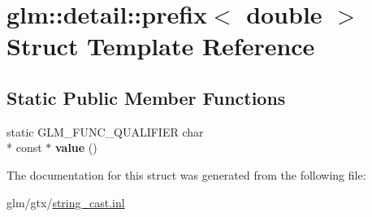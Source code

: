 \hypertarget{structglm_1_1detail_1_1prefix_3_01double_01_4}{\section{glm\-:\-:detail\-:\-:prefix$<$ double $>$ Struct Template Reference}
\label{structglm_1_1detail_1_1prefix_3_01double_01_4}
}
\subsection*{Static Public Member Functions}
\begin{DoxyCompactItemize}
\item 
\hypertarget{structglm_1_1detail_1_1prefix_3_01double_01_4_a39aa4646d7de33a2382c92db849d6eb5}{static G\-L\-M\-\_\-\-F\-U\-N\-C\-\_\-\-Q\-U\-A\-L\-I\-F\-I\-E\-R char \\*
const $\ast$ {\bfseries value} ()}\label{structglm_1_1detail_1_1prefix_3_01double_01_4_a39aa4646d7de33a2382c92db849d6eb5}

\end{DoxyCompactItemize}


The documentation for this struct was generated from the following file\-:\begin{DoxyCompactItemize}
\item 
glm/gtx/\hyperlink{string__cast_8inl}{string\-\_\-cast.\-inl}\end{DoxyCompactItemize}
